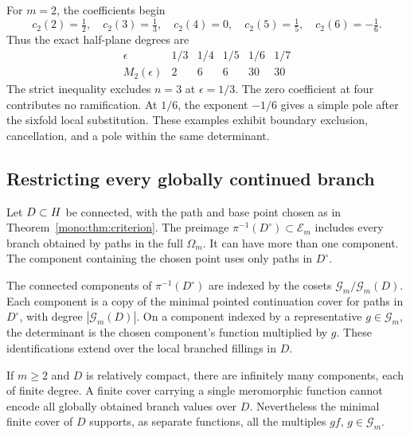 For \(m=2\), the coefficients begin
\[
 c_2(2)=\tfrac12,\quad c_2(3)=\tfrac13,\quad c_2(4)=0,
 \quad c_2(5)=\tfrac15,\quad c_2(6)=-\tfrac16.
\]
Thus the exact half-plane degrees are
\[
 \begin{array}{c|ccccc}
 \epsilon&1/3&1/4&1/5&1/6&1/7\\\hline
 M_2(\epsilon)&2&6&6&30&30
 \end{array}
\]
The strict inequality excludes \(n=3\) at \(\epsilon=1/3\).
The zero coefficient at four contributes no ramification.
At \(1/6\), the exponent \(-1/6\) gives a simple pole after the
sixfold local substitution.
These examples exhibit boundary exclusion, cancellation, and a pole
within the same determinant.

\subsection{Restricting every globally continued branch}

Let \(D\subset H\) be connected, with the path and base point chosen
as in Theorem~\ref{mono:thm:criterion}.
The preimage \(\pi^{-1}(D^\circ)\subset\mathcal E_m\) includes every
branch obtained by paths in the full \(\Omega_m\).
It can have more than one component.  The component containing the
chosen point uses only paths in \(D^\circ\).

\begin{theorem}
\label{mono:thm:restriction}
The connected components of \(\pi^{-1}(D^\circ)\) are indexed by the
cosets \(\mathcal G_m/\mathcal G_m(D)\).
Each component is a copy of the minimal pointed continuation cover for
paths in \(D^\circ\), with degree \(|\mathcal G_m(D)|\).
On a component indexed by a representative \(g\in \mathcal G_m\), the determinant
is the chosen component's function multiplied by \(g\).
These identifications extend over the local branched fillings in \(D\).

If \(m\geq2\) and \(D\) is relatively compact, there are infinitely many
components, each of finite degree.
A finite cover carrying a single meromorphic function cannot encode all
globally obtained branch values over \(D\).
Nevertheless the minimal finite cover of \(D\) supports, as separate
functions, all the multiples \(g f\), \(g\in \mathcal G_m\).
\end{theorem}

